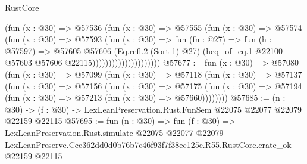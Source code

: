 \begin{lexlean}{RustCore}
\begin{coremodule}
                                  (fun (x : @30) =>
                                  @57536
                                    (fun (x : @30) =>
                                    @57555
                                      (fun (x : @30) =>
                                      @57574
                                        (fun (x : @30) =>
                                        @57593
                                          (fun (x : @30) =>
                                          fun (fn : @27) =>
                                          fun (h : @57597) =>
                                          @57605
                                            @57606
                                            (Eq.refl.{2} (Sort 1) @27)
                                            (heq_of_eq.{1}
                                              @22100
                                              @57603
                                              @57606
                                              @22115)))))))))))))))))))))
@57677 := fun (x : @30) =>
  @57080
    (fun (x : @30) =>
    @57099
      (fun (x : @30) =>
      @57118
        (fun (x : @30) =>
        @57137
          (fun (x : @30) =>
          @57156
            (fun (x : @30) =>
            @57175
              (fun (x : @30) => @57194 (fun (x : @30) => @57213 (fun (x : @30) => @57660))))))))
@57685 := (n : @30) ->
  (f : @30) -> LexLeanPreservation.Rust.FunSem @22075 @22077 @22079 @22159 @22115
@57695 := fun (n : @30) =>
  fun (f : @30) =>
  LexLeanPreservation.Rust.simulate
    @22075
    @22077
    @22079
    LexLeanPreserve.Ccc362dd0d0b76b7c46f93f7f38ec125e.R55.RustCore.crate_ok
    @22159
    @22115
\end{coremodule}
\end{lexlean}
